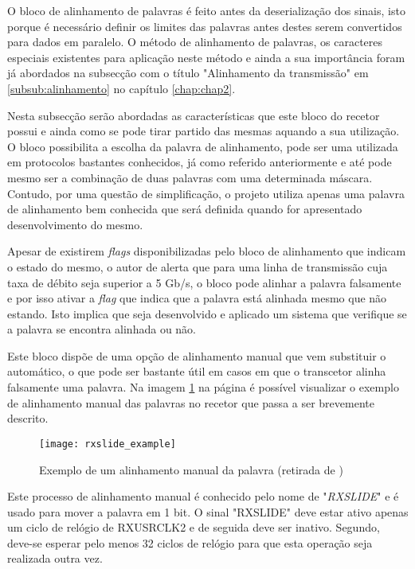 O bloco de alinhamento de palavras é feito antes da deserialização dos sinais, isto porque é necessário definir os limites das palavras antes destes serem convertidos para dados em paralelo. O método de alinhamento de palavras, os caracteres especiais existentes para aplicação neste método e ainda a sua importância foram já abordados na subsecção com o título "Alinhamento da transmissão" em \ref{subsub:alinhamento} no capítulo \ref{chap:chap2}.

Nesta subsecção serão abordadas as características que este bloco do recetor possui e ainda como se pode tirar partido das mesmas aquando a sua utilização. O bloco possibilita a escolha da palavra de alinhamento, pode ser uma utilizada em protocolos bastantes conhecidos, já como referido anteriormente e até pode mesmo ser a combinação de duas palavras com uma determinada máscara. Contudo, por uma questão de simplificação, o projeto utiliza apenas uma palavra de alinhamento bem conhecida que será definida quando for apresentado desenvolvimento do mesmo.

Apesar de existirem \textit{flags} disponibilizadas pelo bloco de alinhamento que indicam o estado do mesmo, o autor de \cite{R011} alerta que para uma linha de transmissão cuja taxa de débito seja superior a 5 Gb/s, o bloco pode alinhar a palavra falsamente e por isso ativar a \textit{flag} que indica que a palavra está alinhada mesmo que não estando. Isto implica que seja desenvolvido e aplicado um sistema que verifique se a palavra se encontra alinhada ou não.


Este bloco dispõe de uma opção de alinhamento manual que vem substituir o automático, o que pode ser bastante útil em casos em que o transcetor alinha falsamente uma palavra. Na imagem \ref{fig:rxslide_example} na página \pageref{fig:rxslide_example} é possível visualizar o exemplo de alinhamento manual das palavras no recetor que passa a ser brevemente descrito.

\begin{figure}[h!]
	\begin{center}
		\leavevmode
		\texttt{[image: rxslide\_example]}
		\captionsetup{width=1.0\linewidth}
		\caption[Exemplo de um alinhamento manual da palavra]{Exemplo de um alinhamento manual da palavra (retirada de \cite{R011})}
		\label{fig:rxslide_example}
	\end{center}
\end{figure}

Este processo de alinhamento manual é conhecido pelo nome de "\textit{RXSLIDE}" e é usado para mover a palavra em 1 bit. O sinal "RXSLIDE" deve estar ativo apenas um ciclo de relógio de RXUSRCLK2 e de seguida deve ser inativo. Segundo, \cite{R011} deve-se esperar pelo menos 32 ciclos de relógio para que esta operação seja realizada outra vez.  

